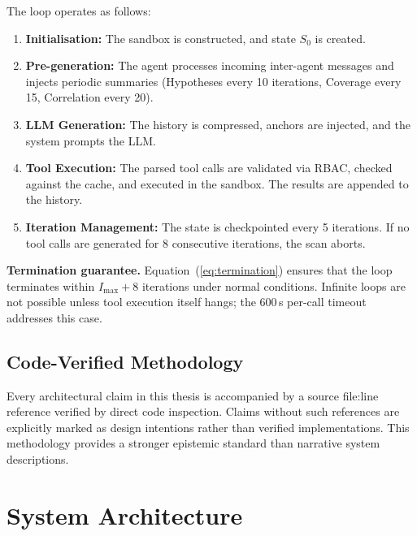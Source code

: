 \documentclass[12pt, a4paper, oneside, openany]{book}
\begin{document}
\begin{infobox}
The loop operates as follows:
\begin{enumerate}[leftmargin=*]
  \item \textbf{Initialisation:} The sandbox is constructed, and state $S_0$ is created.
  \item \textbf{Pre-generation:} The agent processes incoming inter-agent messages and injects periodic summaries (Hypotheses every 10 iterations, Coverage every 15, Correlation every 20).
  \item \textbf{LLM Generation:} The history is compressed, anchors are injected, and the system prompts the LLM.
  \item \textbf{Tool Execution:} The parsed tool calls are validated via RBAC, checked against the cache, and executed in the sandbox. The results are appended to the history.
  \item \textbf{Iteration Management:} The state is checkpointed every 5 iterations. If no tool calls are generated for 8 consecutive iterations, the scan aborts.
\end{enumerate}
\end{infobox}

\textbf{Termination guarantee.}  Equation~(\ref{eq:termination})
ensures that the loop terminates within $I_{\max} + 8$ iterations
under normal conditions.  Infinite loops are not possible unless
tool execution itself hangs; the 600\,s per-call timeout addresses
this case.

\section{Code-Verified Methodology}
\label{sec:formal_method}

Every architectural claim in this thesis is accompanied by a
source file:line reference verified by direct code inspection.
Claims without such references are explicitly marked as design
intentions rather than verified implementations.  This methodology
provides a stronger epistemic standard than narrative system
descriptions.



\chapter{System Architecture}
\label{chap:arch}
\end{document}
